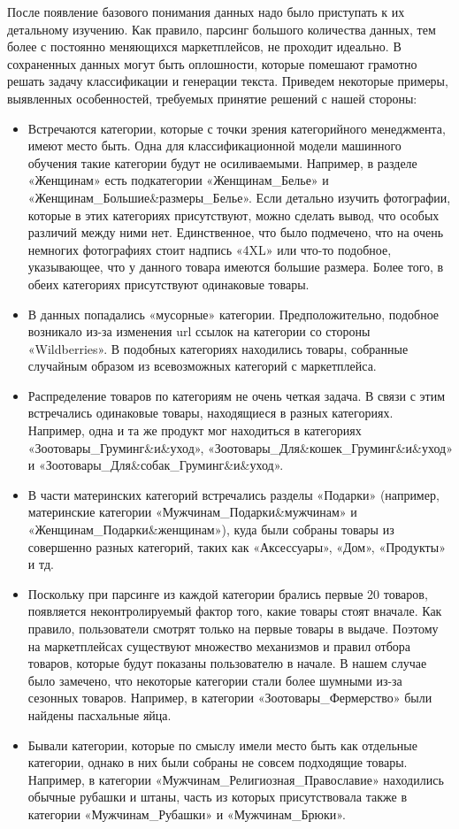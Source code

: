 \documentclass[a4paper,12pt]{extarticle}
\begin{document}
После появление базового понимания данных надо было приступать к их детальному изучению. Как правило, парсинг большого количества данных, тем более с постоянно меняющихся маркетплейсов, не проходит идеально. В сохраненных данных могут быть оплошности, которые помешают грамотно решать задачу классификации и генерации текста. Приведем некоторые примеры, выявленных особенностей, требуемых принятие решений с нашей стороны:
\begin{itemize}
	\item Встречаются категории, которые с точки зрения категорийного менеджмента, имеют место быть. Одна для классификационной модели машинного обучения такие категории будут не осиливаемыми. Например, в разделе «Женщинам» есть подкатегории «Женщинам\_Белье» и «Женщинам\_Большие\&размеры\_Белье». Если детально изучить фотографии, которые в этих категориях присутствуют, можно сделать вывод, что особых различий между ними нет. Единственное, что было подмечено, что на очень немногих фотографиях стоит надпись «4XL» или что-то подобное, указывающее, что у данного товара имеются большие размера. Более того, в обеих категориях присутствуют одинаковые товары.
	\item В данных попадались «мусорные» категории. Предположительно, подобное возникало из-за изменения url ссылок на категории со стороны «Wildberries». В подобных категориях находились товары, собранные случайным образом из всевозможных категорий с маркетплейса.
	\item Распределение товаров по категориям не очень четкая задача. В связи с этим встречались одинаковые товары, находящиеся в разных категориях. Например, одна и та же продукт мог находиться в категориях «Зоотовары\_Груминг\&и\&уход», «Зоотовары\_Для\&кошек\_Груминг\&и\&уход» и «Зоотовары\_Для\&собак\_Груминг\&и\&уход».
	\item В части материнских категорий встречались разделы «Подарки» (например, материнские категории «Мужчинам\_Подарки\&мужчинам» и «Женщинам\_Подарки\&женщинам»), куда были собраны товары из совершенно разных категорий, таких как «Аксессуары», «Дом», «Продукты» и тд.
	\item Поскольку при парсинге из каждой категории брались первые 20 товаров, появляется неконтролируемый фактор того, какие товары стоят вначале. Как правило, пользователи смотрят только на первые товары в выдаче. Поэтому на маркетплейсах существуют множество механизмов и правил отбора товаров, которые будут показаны пользователю в начале. В нашем случае было замечено, что некоторые категории стали более шумными из-за сезонных товаров. Например, в категории «Зоотовары\_Фермерство» были найдены пасхальные яйца.
	\item Бывали категории, которые по смыслу имели место быть как отдельные категории, однако в них были собраны не совсем подходящие товары. Например, в категории «Мужчинам\_Религиозная\_Православие» находились обычные рубашки и штаны, часть из которых присутствовала также в категории «Мужчинам\_Рубашки» и «Мужчинам\_Брюки».
\end{itemize}
\end{document}
